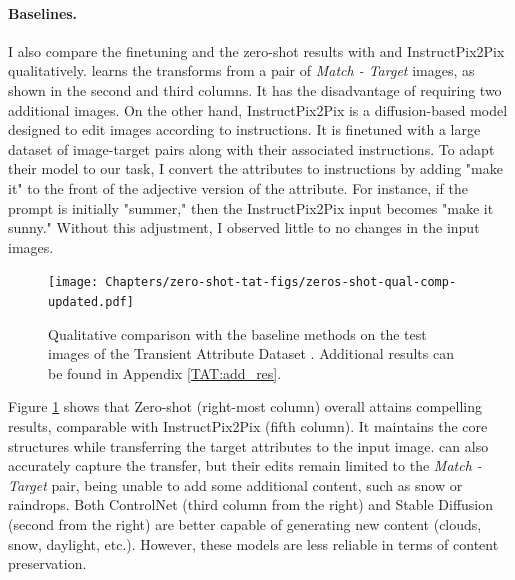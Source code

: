 \paragraph{Baselines.} I also compare the finetuning and the zero-shot results with \citeauthor{laffont2014transient} \cite{laffont2014transient} and InstructPix2Pix \cite{brooks2023instructpix2pix} qualitatively. \citeauthor{laffont2014transient} \cite{laffont2014transient} learns the transforms from a pair of \textit{ Match - Target} images, as shown in the second and third columns. It has the disadvantage of requiring two additional images. On the other hand, InstructPix2Pix \cite{brooks2023instructpix2pix} is a diffusion-based model designed to edit images according to instructions. It is finetuned with a large dataset of image-target pairs along with their associated instructions. To adapt their model to our task, I convert the attributes to instructions by adding "make it" to the front of the adjective version of the attribute. For instance, if the prompt is initially "summer," then the InstructPix2Pix input becomes "make it sunny." Without this adjustment, I observed little to no changes in the input images.


 
 \begin{figure}[ht]
  \texttt{[image: Chapters/zero-shot-tat-figs/zeros-shot-qual-comp-updated.pdf]}
  \caption{Qualitative comparison with the baseline methods on the test images of the Transient Attribute Dataset \cite{laffont2014transient}. Additional results can be found in Appendix \ref{TAT:add_res}.}
  \label{fig:zero-shot-comparison}
\end{figure}

Figure \ref{fig:zero-shot-comparison} shows that Zero-shot (right-most column) overall attains compelling results, comparable with InstructPix2Pix (fifth column). It maintains the core structures while transferring the target attributes to the input image. \citeauthor{laffont2014transient} \cite{laffont2014transient} can also accurately capture the transfer, but their edits remain limited to the \textit{Match - Target} pair, being unable to add some additional content, such as snow or raindrops. Both ControlNet (third column from the right) and Stable Diffusion (second from the right) are better capable of generating new content (clouds, snow, daylight, etc.). However, these models are less reliable in terms of content preservation. 

